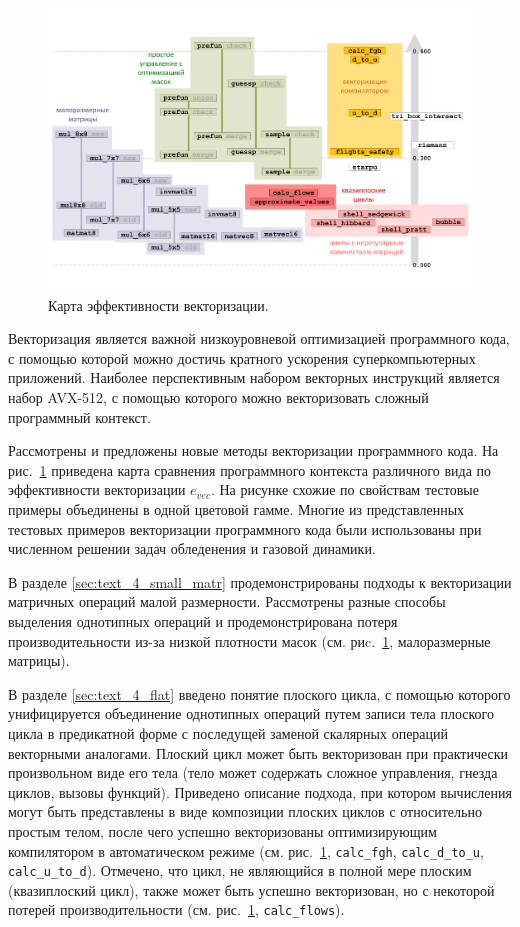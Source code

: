 \begin{figure}[ht]
\centering
\includegraphics[width=1.0\textwidth]{fig/vec_map_cut.pdf}
\singlespacing
{}\caption{Карта эффективности векторизации.}
\label{fig:text_4_fin_map}
\end{figure}

Векторизация является важной низкоуровневой оптимизацией программного кода, с помощью которой можно достичь кратного ускорения суперкомпьютерных приложений.
Наиболее перспективным набором векторных инструкций является набор AVX-512\label{abbr:avx-13}, с помощью которого можно векторизовать сложный программный контекст.

Рассмотрены и предложены новые методы векторизации программного кода.
На рис.~\ref{fig:text_4_fin_map} приведена карта сравнения программного контекста различного вида по эффективности векторизации $e_{vec}$.
На рисунке схожие по свойствам тестовые примеры объединены в одной цветовой гамме.
Многие из представленных тестовых примеров векторизации программного кода были использованы при численном решении задач обледенения и газовой динамики.

В разделе \ref{sec:text_4_small_matr} продемонстрированы подходы к векторизации матричных операций малой размерности.
Рассмотрены разные способы выделения однотипных операций и продемонстрирована потеря производительности из-за низкой плотности масок (см. риc.~\ref{fig:text_4_fin_map}, малоразмерные матрицы).

В разделе \ref{sec:text_4_flat} введено понятие плоского цикла, с помощью которого унифицируется объединение однотипных операций путем записи тела плоского цикла в предикатной форме с последущей заменой скалярных операций векторными аналогами.
Плоский цикл может быть векторизован при практически произвольном виде его тела (тело может содержать сложное управления, гнезда циклов, вызовы функций).
Приведено описание подхода, при котором вычисления могут быть представлены в виде композиции плоских циклов с относительно простым телом, после чего успешно векторизованы оптимизирующим компилятором в автоматическом режиме (см. рис.~\ref{fig:text_4_fin_map}, \texttt{calc\_fgh}, \texttt{calc\_d\_to\_u}, \texttt{calc\_u\_to\_d}).
Отмечено, что цикл, не являющийся в полной мере плоским (квазиплоский цикл), также может быть успешно векторизован, но с некоторой потерей производительности (см. рис.~\ref{fig:text_4_fin_map}, \texttt{calc\_flows}).

